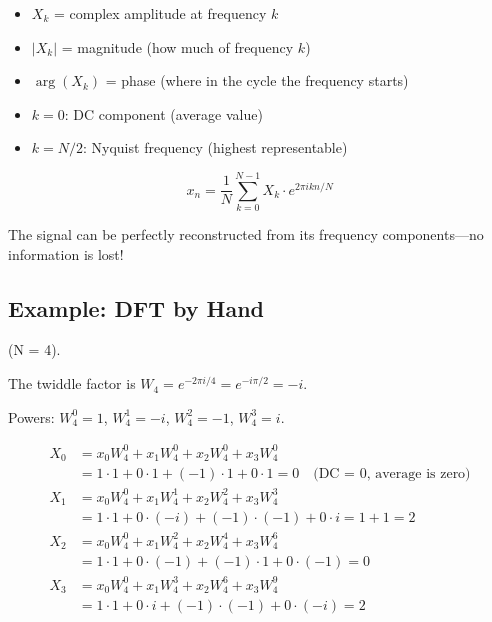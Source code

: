 \begin{itemize}
    \item $X_k$ = complex amplitude at frequency $k$
    \item $|X_k|$ = magnitude (how much of frequency $k$)
    \item $\arg(X_k)$ = phase (where in the cycle the frequency starts)
    \item $k = 0$: DC component (average value)
    \item $k = N/2$: Nyquist frequency (highest representable)
\end{itemize}


\begin{equation}
    x_n = \frac{1}{N} \sum_{k=0}^{N-1} X_k \cdot e^{2\pi i kn/N}
\end{equation}

The signal can be perfectly reconstructed from its frequency components---no information is lost!


\subsection{Example: DFT by Hand}

 (N = 4).

The twiddle factor is $W_4 = e^{-2\pi i/4} = e^{-i\pi/2} = -i$.

Powers: $W_4^0 = 1$, $W_4^1 = -i$, $W_4^2 = -1$, $W_4^3 = i$.

\begin{align*}
    X_0 &= x_0 W_4^0 + x_1 W_4^0 + x_2 W_4^0 + x_3 W_4^0 \\
    &= 1 \cdot 1 + 0 \cdot 1 + (-1) \cdot 1 + 0 \cdot 1 = 0 \quad \text{(DC = 0, average is zero)} \\[0.5em]
    X_1 &= x_0 W_4^0 + x_1 W_4^1 + x_2 W_4^2 + x_3 W_4^3 \\
    &= 1 \cdot 1 + 0 \cdot (-i) + (-1) \cdot (-1) + 0 \cdot i = 1 + 1 = 2 \\[0.5em]
    X_2 &= x_0 W_4^0 + x_1 W_4^2 + x_2 W_4^4 + x_3 W_4^6 \\
    &= 1 \cdot 1 + 0 \cdot (-1) + (-1) \cdot 1 + 0 \cdot (-1) = 0 \\[0.5em]
    X_3 &= x_0 W_4^0 + x_1 W_4^3 + x_2 W_4^6 + x_3 W_4^9 \\
    &= 1 \cdot 1 + 0 \cdot i + (-1) \cdot (-1) + 0 \cdot (-i) = 2
\end{align*}

